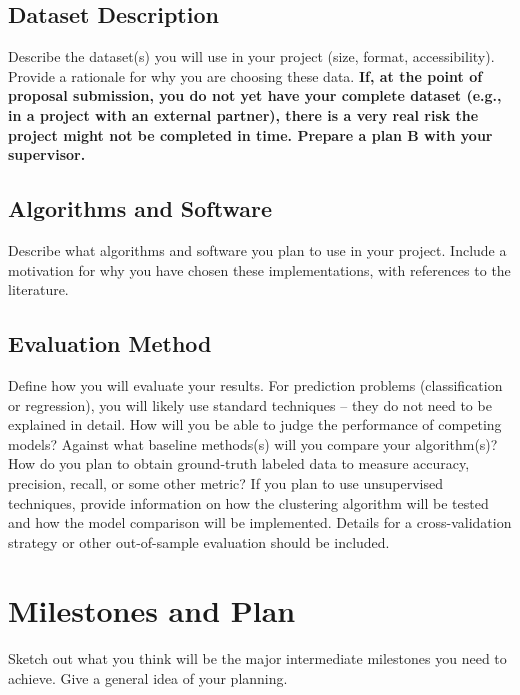 \documentclass[11pt, a4paper]{article}
\begin{document}
\subsection{Dataset Description}
Describe the dataset(s) you will use in your project (size, format, accessibility). Provide a rationale for why you are choosing these data. \textbf{If, at the point of proposal submission, you do not yet have your complete dataset (e.g., in a project with an external partner), there is a very real risk the project might not be completed in time. Prepare a plan B with your supervisor.} 

\subsection{Algorithms and Software}
Describe what algorithms and software you plan to use in your project. Include a motivation for why you have chosen these implementations, with references to the literature.

\subsection{Evaluation Method}
Define how you will evaluate your results. For prediction problems (classification or regression), you will likely use standard techniques – they do not need to be explained in detail. How will you be able to judge the performance of competing models? Against what baseline methods(s) will you compare your algorithm(s)? How do you plan to obtain ground-truth labeled data to measure accuracy, precision, recall, or some other metric? If you plan to use unsupervised techniques, provide information on how the clustering algorithm will be tested and how the model comparison will be implemented. Details for a cross-validation strategy or other out-of-sample evaluation should be included.
\section{Milestones and Plan}

Sketch out what you think will be the major intermediate milestones you need to achieve. Give a general idea of your planning.

\printbibliography
\end{document}
